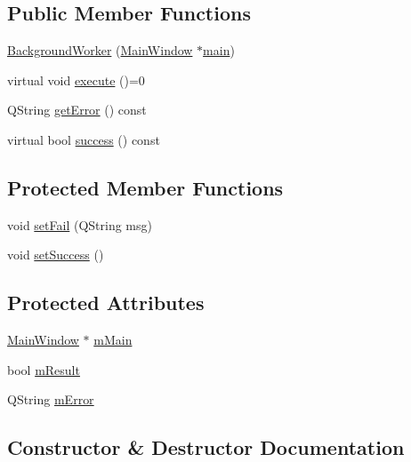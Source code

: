 \subsection*{Public Member Functions}
\begin{DoxyCompactItemize}
\item 
\mbox{\hyperlink{class_background_worker_aeae5f3bf1d24a8d4cf4fac5b775201d6}{Background\+Worker}} (\mbox{\hyperlink{class_main_window}{Main\+Window}} $\ast$\mbox{\hyperlink{tseditor_8cpp_a0ddf1224851353fc92bfbff6f499fa97}{main}})
\item 
virtual void \mbox{\hyperlink{class_background_worker_ad9a721283a7c4aeb7c7a928ff677da00}{execute}} ()=0
\item 
Q\+String \mbox{\hyperlink{class_background_worker_a206b6e5d08e36bc964287469566b9af3}{get\+Error}} () const
\item 
virtual bool \mbox{\hyperlink{class_background_worker_a9ccc9c8e6bebdb5714354c6e3207fdee}{success}} () const
\end{DoxyCompactItemize}
\subsection*{Protected Member Functions}
\begin{DoxyCompactItemize}
\item 
void \mbox{\hyperlink{class_background_worker_a8845e4dbf8ec3cc43808740f79824615}{set\+Fail}} (Q\+String msg)
\item 
void \mbox{\hyperlink{class_background_worker_ad8d74c9e01123306ba7f730562634ecd}{set\+Success}} ()
\end{DoxyCompactItemize}
\subsection*{Protected Attributes}
\begin{DoxyCompactItemize}
\item 
\mbox{\hyperlink{class_main_window}{Main\+Window}} $\ast$ \mbox{\hyperlink{class_background_worker_a53e73f68a77533d694efd1c75b102cf7}{m\+Main}}
\item 
bool \mbox{\hyperlink{class_background_worker_a0873b7881ba8f957a52fc93814b97f89}{m\+Result}}
\item 
Q\+String \mbox{\hyperlink{class_background_worker_a1e6ed86962450194e35e03fbf55bcff4}{m\+Error}}
\end{DoxyCompactItemize}


\subsection{Constructor \& Destructor Documentation}
\mbox{\label{class_background_worker_aeae5f3bf1d24a8d4cf4fac5b775201d6}} 
